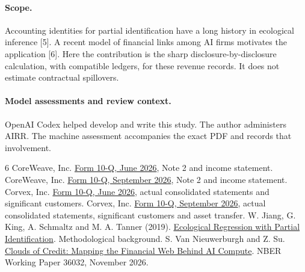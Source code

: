 \documentclass[11pt]{article}
\begin{document}
\paragraph{Scope.} Accounting identities for partial identification have a long history in ecological inference [5]. A recent model of financial links among AI firms motivates the application [6]. Here the contribution is the sharp disclosure-by-disclosure calculation, with compatible ledgers, for these revenue records. It does not estimate contractual spillovers.

\paragraph{Model assessments and review context.} OpenAI Codex helped develop and write this study. The author administers AIRR. The machine assessment accompanies the exact PDF and records that involvement.

\begin{thebibliography}{6}\small
{} CoreWeave, Inc. \href{https://www.sec.gov/Archives/edgar/data/1769628/000176962826000366/crwv-20260630.htm}{Form 10-Q, June 2026}, Note 2 and income statement.
 CoreWeave, Inc. \href{https://www.sec.gov/Archives/edgar/data/1769628/000176962826000465/crwv-20260930.htm}{Form 10-Q, September 2026}, Note 2 and income statement.
 Corvex, Inc. \href{https://www.sec.gov/Archives/edgar/data/1734750/000121390026090091/ea0301480-10q_corvex.htm}{Form 10-Q, June 2026}, actual consolidated statements and significant customers.
 Corvex, Inc. \href{https://www.sec.gov/Archives/edgar/data/1734750/000121390026118794/ea0309925-10q_corvex.htm}{Form 10-Q, September 2026}, actual consolidated statements, significant customers and asset transfer.
 W. Jiang, G. King, A. Schmaltz and M. A. Tanner (2019). \href{https://gking.harvard.edu/files/gking/files/eiid.pdf}{Ecological Regression with Partial Identification}. Methodological background.
 S. Van Nieuwerburgh and Z. Su. \href{https://doi.org/10.3386/w36032}{Clouds of Credit: Mapping the Financial Web Behind AI Compute}. NBER Working Paper 36032, November 2026.
\end{thebibliography}
\end{document}
